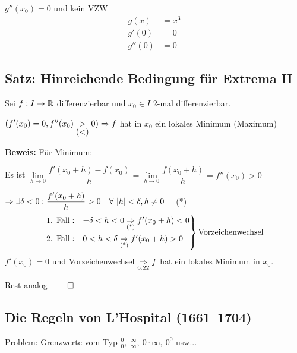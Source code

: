 \documentclass[10pt, a4paper, fleqn]{article}
\begin{document}
\hfill
\begin{minipage}{0.4\textwidth}
\end{minipage}
\hfill
\begin{minipage}{0.4\textwidth}
    $g''(x_0) = 0$ und kein VZW
    \[\begin{aligned}
        g(x) &= x^3 \\
        g'(0) &= 0 \\
        g''(0) &= 0
    \end{aligned}\]
\end{minipage}

\subsection{Satz: Hinreichende Bedingung für Extrema II}
Sei $f: I \to \mathbb{R}$ differenzierbar und $x_0 \in I$ 2-mal differenzierbar.

$(f'(x_0) = 0, f''(x_0) \underset{\hbox{$(<)$}}{>} 0) \Rightarrow 
f $ hat in $x_0$ ein lokales Minimum (Maximum)

\textbf{Beweis: } Für Minimum:

Es ist $\lim\limits_{h \to 0} \dfrac{f'(x_0 + h) - f(x_0)}{h} =
\lim\limits_{h \to 0} \dfrac{f(x_0 + h)}{h} = f''(x_0) > 0$

$\Rightarrow \exists \delta < 0: \dfrac{f'(x_0 + h)}{h} > 0 \quad \forall \ |h| < \delta, h \neq 0 \quad$ (*)
\[\begin{rcases}
    \text{1. Fall}: & -\delta < h < 0 \underset{\text{(*)}}{\Rightarrow} f'(x_0 + h) < 0 \\
    \text{2. Fall}: & 0 < h < \delta \underset{\text{(*)}}{\Rightarrow} f'(x_0 + h) > 0
\end{rcases} \text{Vorzeichenwechsel}\]
$f'(x_0) = 0$ und Vorzeichenwechsel $\underset{6.22}{\Rightarrow} f$ hat ein lokales Minimum in $x_0$.

Rest analog $\qed$

\subsection*{Die Regeln von L'Hospital (1661--1704)}
Problem: Grenzwerte vom Typ $\frac{0}{0}, \ \frac{\infty}{\infty}, \ 0 \cdot \infty, \ 0^0$ usw...
\end{document}
